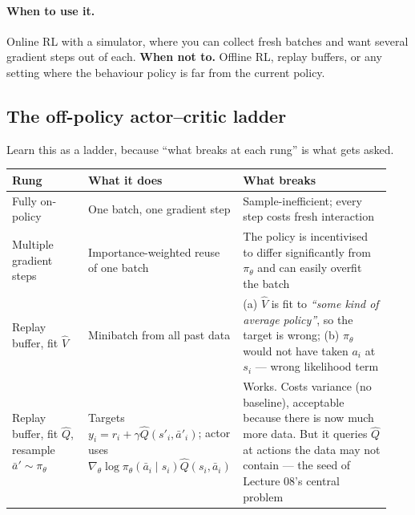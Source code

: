 \documentclass[11pt,a4paper]{article}
\begin{document}
\paragraph{When to use it.} Online RL with a simulator, where you can collect
fresh batches and want several gradient steps out of each.
\textbf{When not to.} Offline RL, replay buffers, or any setting where the
behaviour policy is far from the current policy.

\subsection{The off-policy actor--critic ladder}

Learn this as a ladder, because ``what breaks at each rung'' is what gets asked.

\begin{center}
\begin{tabular}{@{}p{0.20\linewidth}p{0.35\linewidth}p{0.39\linewidth}@{}}
\toprule
\textbf{Rung} & \textbf{What it does} & \textbf{What breaks} \\
\midrule
Fully on-policy & One batch, one gradient step & Sample-inefficient; every step costs fresh interaction \\
\addlinespace
Multiple gradient steps & Importance-weighted reuse of one batch & The policy is incentivised to differ significantly from $\pi_\theta$ and can easily overfit the batch \\
\addlinespace
Replay buffer, fit $\hat V$ & Minibatch from all past data &
(a) $\hat V$ is fit to \emph{``some kind of average policy''}, so the target is
wrong; (b) $\pi_\theta$ would not have taken $a_i$ at $s_i$ --- wrong
likelihood term \\
\addlinespace
Replay buffer, fit $\hat Q$, resample $\bar a'\sim\pi_\theta$ &
Targets $y_i=r_i+\gamma\hat Q(s'_i,\bar a'_i)$; actor uses
$\nabla_\theta\log\pi_\theta(\bar a_i\mid s_i)\hat Q(s_i,\bar a_i)$ &
Works. Costs variance (no baseline), acceptable because there is now much
more data. But it queries $\hat Q$ at actions the data may not contain --- the
seed of Lecture 08's central problem \\
\bottomrule
\end{tabular}
\end{center}
\end{document}
